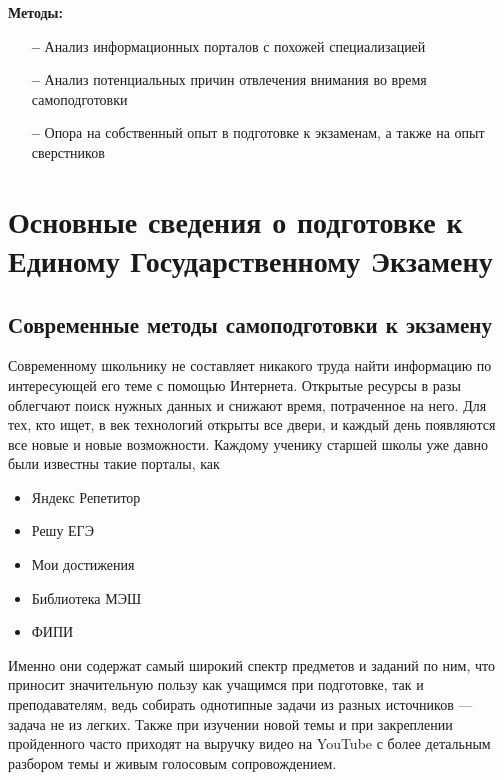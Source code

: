 \documentclass[a4paper, 12pt]{extarticle}
\begin{document}
\vspace{2mm}
\textbf{Методы:}
\begin{itemize}
    \item[\bfseries--] Анализ информационных порталов с похожей специализацией
    \item[\bfseries--] Анализ потенциальных причин отвлечения внимания во время
        самоподготовки
    \item[\bfseries--] Опора на собственный опыт в подготовке к экзаменам, а
        также на опыт сверстников
\end{itemize}
\newpage

\section{Основные сведения о подготовке к Единому Государственному Экзамену}
\subsection{Современные методы самоподготовки к экзамену}
\vspace{2mm}
Современному школьнику не составляет никакого труда найти информацию по
интересующей его теме с помощью Интернета. Открытые ресурсы в разы облегчают
поиск нужных данных и снижают время, потраченное на него. Для тех, кто ищет, в век
технологий открыты все двери, и каждый день появляются все новые и новые
возможности. Каждому ученику старшей школы уже давно были известны такие
порталы, как
\begin{itemize}
    \item {\small Яндекс Репетитор\par}
    \item {\small Решу ЕГЭ\par}
    \item {\small Мои достижения\par}
    \item {\small Библиотека МЭШ\par}
    \item {\small ФИПИ\par}

\end{itemize}
Именно они содержат самый широкий спектр предметов и заданий по ним, что
приносит значительную пользу как учащимся при подготовке, так и преподавателям, ведь собирать
однотипные задачи из разных источников — задача не из легких. Также при изучении
новой темы и при закреплении пройденного часто приходят на выручку видео на
YouTube с более детальным разбором темы и живым голосовым сопровождением.
\\
\end{document}
